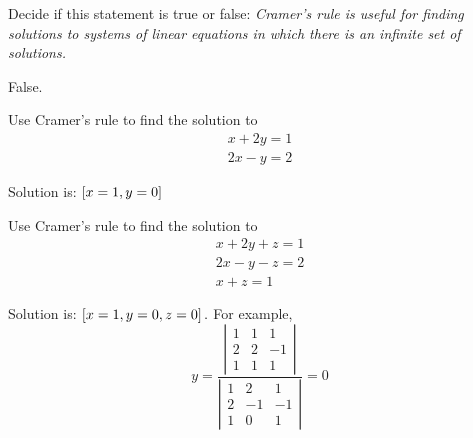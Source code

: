 \begin{enumialphparenastyle}

\begin{ex}Decide if this statement is true or false: \textit{Cramer's rule is useful for finding solutions to systems of linear
equations in which there is an infinite set of solutions.} 
\begin{sol}
False.
\end{sol}
\end{ex}

\begin{ex} Use Cramer's rule to find the solution to 
\begin{equation*}
\begin{array}{c}
x+2y=1 \\
2x-y=2
\end{array}
\end{equation*}
\begin{sol}
Solution is: $\left[x=1,y=0\right] $
\end{sol}
\end{ex}

\begin{ex} Use Cramer's rule to find the solution to 
\begin{equation*}
\begin{array}{c}
x+2y+z=1 \\
2x-y-z=2 \\
x+z=1
\end{array}
\end{equation*}
\begin{sol}
Solution is: $\left[x=1,y=0,z=0\right] .$ For example,
\[
y=\frac{\left\vert
\begin{array}{rrr}
1 & 1 & 1 \\
2 & 2 & -1 \\
1 & 1 & 1
\end{array}
\right\vert }{\left\vert
\begin{array}{rrr}
1 & 2 & 1 \\
2 & -1 & -1 \\
1 & 0 & 1
\end{array}
\right\vert }=0
\]
\end{sol}
\end{ex}

\end{enumialphparenastyle}